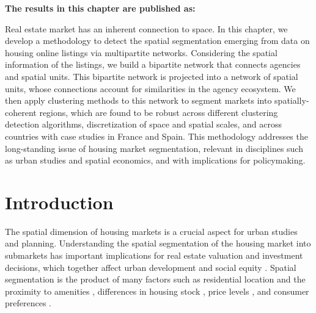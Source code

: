 \vspace{-1.5cm}
\small
\textbf{The results in this chapter are published as:}
\vspace{0.05 cm}

\normalsize
\vspace{0.5 cm}

Real estate market has an inherent connection to space. In this chapter, we develop a methodology to detect the spatial segmentation emerging from data on housing online listings via multipartite networks. Considering the spatial information of the listings, we build a bipartite network that connects agencies and spatial units. This bipartite network is projected into a network of spatial units, whose connections account for similarities in the agency ecosystem. We then apply clustering methods to this network to segment  markets into spatially-coherent regions, which are found to be robust across different clustering detection algorithms, discretization of space and spatial scales, and across countries with case studies in France and Spain. This methodology addresses the long-standing issue of housing market segmentation, relevant in disciplines such as urban studies and spatial economics, and with implications for policymaking. 

\section{Introduction}
\label{sec:introduction}

The spatial dimension of housing markets is a crucial aspect for urban studies and planning. Understanding the spatial segmentation of the housing market into submarkets \cite{morawakage2022housing,bourassa2003housing} has important implications for real estate valuation and investment decisions, which together affect urban development and social equity \cite{bourassa2003housing}. Spatial segmentation is the product of many factors such as residential location and the proximity to amenities \cite{bourassa2003housing}, differences in housing stock \cite{keskin2017defining}, price levels \cite{goodman1998housing}, and consumer preferences \cite{leishman2013predictive}. 


